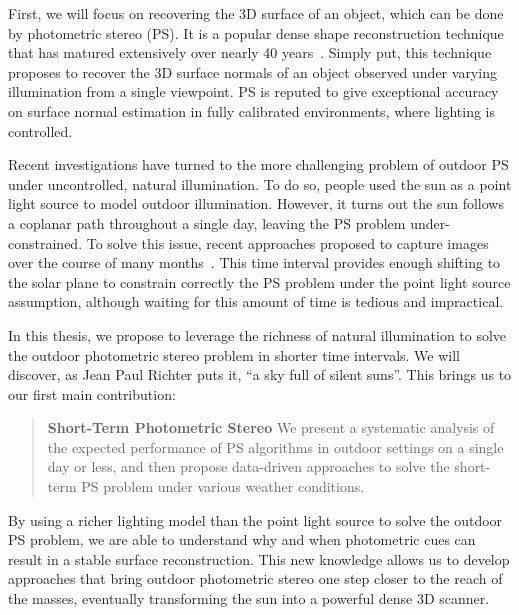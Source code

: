 First, we will focus on recovering the 3D surface of an object, which can be done by photometric stereo (PS). It is a popular dense shape reconstruction technique that has matured extensively over nearly 40 years~\cite{woodham-opteng-80}. %
Simply put, this technique proposes to recover the 3D surface normals of an object observed under varying illumination from a single viewpoint.
PS is reputed to give exceptional accuracy on surface normal estimation in fully calibrated environments, where lighting is controlled.

Recent investigations have turned to the more challenging problem of outdoor PS under uncontrolled, natural illumination. To do so, people used the sun as a point light source to model outdoor illumination. However, it turns out the sun follows a coplanar path throughout a single day, leaving the PS problem under-constrained. To solve this issue, recent approaches proposed to capture images over the course of many months~\cite{ackermann-cvpr-12,abrams-eccv-12}. This time interval provides enough shifting to the solar plane to constrain correctly the PS problem under the point light source assumption, although waiting for this amount of time is tedious and impractical.


In this thesis, we propose to leverage the richness of natural illumination to solve the outdoor photometric stereo problem in shorter time intervals. We will discover, as Jean Paul Richter puts it, ``a sky full of silent suns''. This brings us to our first main contribution:
%
\begin{quotation}
\textbf{Short-Term Photometric Stereo} We present a systematic analysis of the expected performance of PS algorithms in outdoor settings on a single day or less, and then propose data-driven approaches to solve the short-term PS problem under various weather conditions.
\end{quotation}

By using a richer lighting model than the point light source to solve the outdoor PS problem, we are able to understand why and when photometric cues can result in a stable surface reconstruction. This new knowledge allows us to develop approaches that bring outdoor photometric stereo one step closer to the reach of the masses, eventually transforming the sun into a powerful dense 3D scanner.

